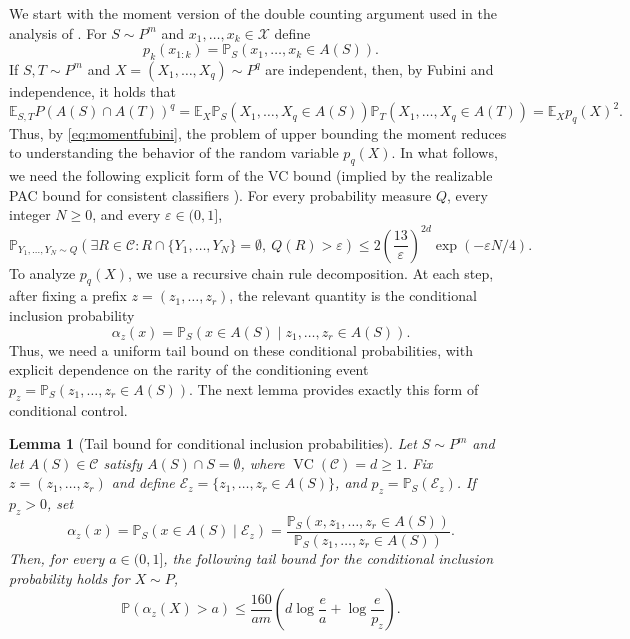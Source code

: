 \documentclass[11pt]{article}
\newcommand{\X}{\mathcal X}
\newcommand{\C}{\mathcal C}
\newcommand{\E}{\mathbb E}
\newcommand{\Prb}{\mathbb P}
\newcommand{\1}{\mathbf 1}
\newcommand{\vc}{\operatorname{VC}}
\theoremstyle{plain}
\newtheorem{lemma}[theorem]{Lemma}
\theoremstyle{remark}
\begin{document}
We start with the moment version of the double counting argument used in the analysis of \cite{AdenAliHogsgaardLarsenZhivotovskiy2024}. For $S \sim P^m$ and $x_1, \ldots, x_k \in \X$ define
 \begin{equation}
\label{eq:pq}
p_k(x_{1:k})=\Prb_S(x_1,\ldots,x_k\in A(S)).
\end{equation}
If $S,T\sim P^m$ and $X=(X_1,\ldots,X_q)\sim P^q$ are independent, then, by Fubini and independence, it holds that
\begin{equation}
\label{eq:momentfubini}
\E_{S,T}P(A(S)\cap A(T))^q
=\E_X\Prb_S(X_1,\ldots,X_q\in A(S))
        \Prb_T(X_1,\ldots,X_q\in A(T))
=\E_Xp_q(X)^2.
\end{equation}
Thus, by \eqref{eq:momentfubini},  the problem of upper bounding the moment reduces to understanding the behavior of the random variable $p_q(X)$. In what follows, we need the following explicit form of the VC bound (implied by the realizable PAC bound for consistent classifiers \cite[Theorem~2]{BlumerEhrenfeuchtHausslerWarmuth1989}). For every probability measure $Q$, every integer $N\ge0$, and every $\varepsilon\in(0,1]$,
\begin{equation}
\Prb_{Y_1,\ldots,Y_N\sim Q}
\left(\exists R\in\C:R\cap\{Y_1,\ldots,Y_N\}=\emptyset,\ Q(R)>\varepsilon\right)
\le
2\left(\frac{13}{\varepsilon}\right)^{2d}\exp\left(-\varepsilon N/4\right).
\label{eq:VC-net-explicit}
\end{equation}
To analyze $p_q(X)$, we use a recursive chain rule decomposition.  At each
step, after fixing a prefix $z=(z_1,\ldots,z_r)$, the relevant quantity is the
conditional inclusion probability
\[
\alpha_z(x)
=
\Prb_S\left(x\in A(S)\mid z_1,\ldots,z_r\in A(S)\right).
\]
Thus, we need a uniform tail bound
on these conditional probabilities, with explicit dependence on the rarity of
the conditioning event
$
p_z=\Prb_S\left(z_1,\ldots,z_r\in A(S)\right).
$
The next lemma provides exactly this form of conditional control.  
\begin{lemma}[Tail bound for conditional inclusion probabilities]
\label{lem:conditioned}
Let $S\sim P^m$ and let $A(S)\in\C$ satisfy $A(S)\cap S=\emptyset$, where $\vc(\C)=d\ge1$.  Fix $z=(z_1,\ldots,z_r)$ and define
$
\mathcal E_z=\{z_1,\ldots,z_r\in A(S)\}$, and $
p_z=\Prb_S(\mathcal E_z)$.
If $p_z>0$, set
\[
\alpha_z(x)=\Prb_S(x\in A(S)\mid \mathcal E_z) = \frac{\Prb_S(x, z_1, \ldots, z_r\in A(S))}{\Prb_S(z_1, \ldots, z_r\in A(S))}.
\]
Then, for every $a\in(0,1]$, the following tail bound for the conditional inclusion probability holds for $X \sim P$,
\[
\Prb\left(\alpha_z(X)>a\right)
 \le \frac{160}{am}\left(d\log\frac ea+\log\frac e{p_z}\right).
\]
\end{lemma}
\end{document}
